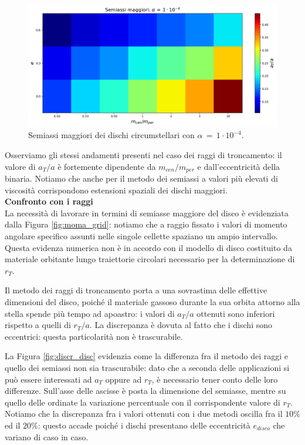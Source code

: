 \begin{figure}[H]
  \centering
  \includegraphics[width=\textwidth]{Immagini/Risultati/semiassi_alfa4.png}
  \caption{Semiassi maggiori dei dischi circumstellari con $\alpha\,=\,1 \cdot 10^{-4}$. }
  \label{fig:sax_alfa4}
\end{figure}
Osserviamo gli stessi andamenti presenti nel caso dei raggi di troncamento: il valore di $a_T/a$ è fortemente dipendente da $m_{cen}/m_{per}$ e dall'eccentricità della binaria.
Notiamo che anche per il metodo dei semiassi a valori più elevati di viscosità corrispondono estensioni spaziali dei dischi maggiori.\\

\textbf{Confronto con i raggi}\\

La necessità di lavorare in termini di semiasse maggiore del disco è evidenziata dalla Figura \ref{fig:moma_grid}: notiamo che a raggio fissato i valori di momento angolare specifico assunti nelle singole cellette spaziano un ampio intervallo.
Questa evidenza numerica non è in accordo con il modello di disco costituito da materiale orbitante lungo traiettorie circolari necessario per la determinazione di $r_T$.

Il metodo dei raggi di troncamento porta a una sovrastima delle effettive dimensioni del disco, poiché il materiale gassoso durante la sua orbita attorno alla stella spende più tempo ad apoastro: i valori di $a_T/a$ ottenuti sono inferiori rispetto a quelli di $r_T/a$. La discrepanza è dovuta al fatto che i dischi sono eccentrici: questa particolarità non è trascurabile.

La Figura \ref{fig:discr_disc} evidenzia come la differenza fra il metodo dei raggi e quello dei semiassi non sia trascurabile: dato che a seconda delle applicazioni si può essere interessati ad $a_T$ oppure ad $r_T$, è necessario tener conto delle loro differenze.
Sull'asse delle ascisse è posta la dimensione del semiasse, mentre su quello delle ordinate la variazione percentuale con il corrispondente valore di $r_T$.
Notiamo che la discrepanza fra i valori ottenuti con i due metodi oscilla fra il $10\%$ ed il $20\%$: questo accade poiché i dischi presentano delle eccentricità $e_{disco}$ che variano di caso in caso.

